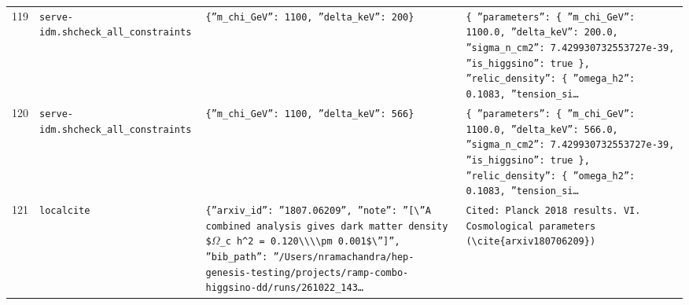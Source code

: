 \documentclass[11pt,a4paper]{article}
\begin{document}
\begin{longtable}{@{}p{}p{}p{}p{}@{}}
119 & \texttt{serve-idm.sh}\newline\texttt{check\_\allowbreak{}all\_\allowbreak{}constraints} & \texttt{\{''m\_\allowbreak{}chi\_\allowbreak{}GeV'':\allowbreak{} 1100,\allowbreak{} ''delta\_\allowbreak{}keV'':\allowbreak{} 200\}\allowbreak{}} & \texttt{\{   ''parameters'':\allowbreak{} \{     ''m\_\allowbreak{}chi\_\allowbreak{}GeV'':\allowbreak{} 1100.0,\allowbreak{}     ''delta\_\allowbreak{}keV'':\allowbreak{} 200.0,\allowbreak{}     ''sigma\_\allowbreak{}n\_\allowbreak{}cm2'':\allowbreak{} 7.429930732553727e-39,\allowbreak{}     ''is\_\allowbreak{}higgsino'':\allowbreak{} true   \}\allowbreak{},\allowbreak{}   ''relic\_\allowbreak{}density'':\allowbreak{} \{     ''omega\_\allowbreak{}h2'':\allowbreak{} 0.1083,\allowbreak{}     ''tension\_\allowbreak{}si\ldots{}\allowbreak{}} \\
120 & \texttt{serve-idm.sh}\newline\texttt{check\_\allowbreak{}all\_\allowbreak{}constraints} & \texttt{\{''m\_\allowbreak{}chi\_\allowbreak{}GeV'':\allowbreak{} 1100,\allowbreak{} ''delta\_\allowbreak{}keV'':\allowbreak{} 566\}\allowbreak{}} & \texttt{\{   ''parameters'':\allowbreak{} \{     ''m\_\allowbreak{}chi\_\allowbreak{}GeV'':\allowbreak{} 1100.0,\allowbreak{}     ''delta\_\allowbreak{}keV'':\allowbreak{} 566.0,\allowbreak{}     ''sigma\_\allowbreak{}n\_\allowbreak{}cm2'':\allowbreak{} 7.429930732553727e-39,\allowbreak{}     ''is\_\allowbreak{}higgsino'':\allowbreak{} true   \}\allowbreak{},\allowbreak{}   ''relic\_\allowbreak{}density'':\allowbreak{} \{     ''omega\_\allowbreak{}h2'':\allowbreak{} 0.1083,\allowbreak{}     ''tension\_\allowbreak{}si\ldots{}\allowbreak{}} \\
121 & \texttt{local}\newline\texttt{cite} & \texttt{\{''arxiv\_\allowbreak{}id'':\allowbreak{} ''1807.06209'',\allowbreak{} ''note'':\allowbreak{} ''[\textbackslash{}\allowbreak{}''A combined analysis gives dark matter density \$$\Omega$\_\allowbreak{}c h\textasciicircum{}\allowbreak{}2 =\allowbreak{} 0.120\textbackslash{}\allowbreak{}\textbackslash{}\allowbreak{}\textbackslash{}\allowbreak{}\textbackslash{}\allowbreak{}pm 0.001\$\textbackslash{}\allowbreak{}'']\allowbreak{}'',\allowbreak{} ''bib\_\allowbreak{}path'':\allowbreak{} ''/\allowbreak{}Users/\allowbreak{}nramachandra/\allowbreak{}hep-genesis-testing/\allowbreak{}projects/\allowbreak{}ramp-combo-higgsino-dd/\allowbreak{}runs/\allowbreak{}261022\_\allowbreak{}143\ldots{}\allowbreak{}} & \texttt{Cited:\allowbreak{} Planck 2018 results. VI. Cosmological parameters (\textbackslash{}\allowbreak{}cite\{arxiv180706209\}\allowbreak{})\allowbreak{}} \\

\end{longtable}
\end{document}
